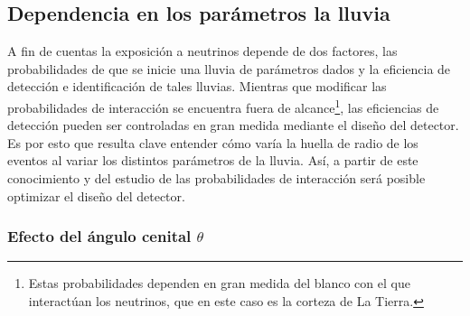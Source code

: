 	
% 		
% 	
% 	
% 	
% 	
% 		
	
	\subsection{Dependencia en los par\'ametros la lluvia}
	
	A fin de cuentas la exposici\'on a neutrinos depende de dos factores, las probabilidades de que se inicie una lluvia de par\'ametros dados y la eficiencia de detecci\'on e identificaci\'on de tales lluvias.
	Mientras que modificar las probabilidades de interacci\'on se encuentra fuera de alcance\footnote{Estas probabilidades dependen en gran medida del blanco con el que interact\'uan los neutrinos, que en este caso es la corteza de La Tierra.}, las eficiencias de detecci\'on pueden ser controladas en gran medida mediante el dise\~no del detector. 
	Es por esto que resulta clave entender c\'omo var\'ia la huella de radio de los eventos al variar los distintos par\'ametros de la lluvia.
	As\'i, a partir de este conocimiento y del estudio de las probabilidades de interacci\'on ser\'a posible optimizar el dise\~no del detector.
	
	\subsubsection{Efecto del \'angulo cenital $\theta$}
	
